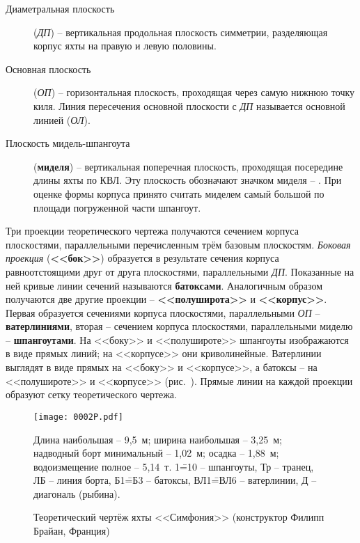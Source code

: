 \begin{description}
\item [Диаметральная плоскость]
  (\textit{ДП}) \--- вертикальная продольная плоскость симметрии,
  разделяющая корпус яхты на правую и левую половины.
\item [Основная плоскость] (\textit{ОП})
  \--- горизонтальная плоскость, проходящая через самую нижнюю точку
  киля. Линия пересечения основной плоскости с \textit{ДП} называется
  основной линией (\textit{ОЛ}).
\item [Плоскость мидель-шпангоута]
  (\textbf{миделя}) \--- вертикальная поперечная
  плоскость, проходящая посередине длины яхты по КВЛ. Эту плоскость
  обозначают значком миделя \--- \midelsign. При оценке формы корпуса
  принято считать миделем самый большой по площади погруженной части
  шпангоут.
\end{description}

Три проекции теоретического чертежа получаются сечением корпуса
плоскостями, параллельными перечисленным трём базовым
плоскостям. \textit{Боковая проекция} (\textbf{<<бок>>}) образуется в
результате сечения корпуса равноотстоящими друг от друга плоскостями,
параллельными \textit{ДП}. Показанные на ней кривые линии сечений
называются \textbf{батоксами}. Аналогичным образом получаются две
другие проекции \--- \textbf{<<полуширота>>} и
\textbf{<<корпус>>}. Первая образуется сечениями корпуса плоскостями,
параллельными \textit{ОП} \--- \textbf{ватерлиниями}, вторая \---
сечением корпуса плоскостями, параллельными миделю \---
\textbf{шпангоутами}. На <<боку>> и <<полушироте>> шпангоуты
изображаются в виде прямых линий; на <<корпусе>> они
криволинейные. Ватерлинии выглядят в виде прямых на <<боку>> и
<<корпусе>>, а батоксы \--- на <<полушироте>> и <<корпусе>>
(рис.~). Прямые линии на каждой проекции образуют сетку
теоретического чертежа.

\begin{figure*}[!htb]
   \centering
   \texttt{[image: 0002P.pdf]}
   \caption[Теоретический чертёж яхты <<Симфония>>]{Теоретический
     чертёж яхты <<Симфония>> (конструктор Филипп Брайан, Франция)}
   \label{fig:2}
   \centering{}
   \small  
   Длина наибольшая \--- 9,5~м;
   ширина наибольшая \--- 3,25~м;
   надводный борт минимальный \--- 1,02~м;
   осадка \--- 1,88~м;
   водоизмещение полное \--- 5,14~т.
   1\==10 \--- шпангоуты,
   Тр \--- транец,
   ЛБ \--- линия борта,
   Б1\==Б3 \--- батоксы,
   ВЛ1\==ВЛ6 \--- ватерлинии,
   Д \--- диагональ (рыбина).
\end{figure*}

